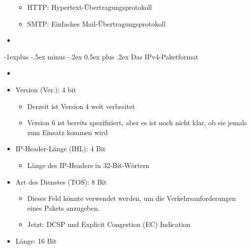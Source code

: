 \documentclass[a4paper]{article}
\makeatletter
\renewcommand{\subsection}{\@startsection{subsection}{2}{0mm}%
 {-1explus -.5ex minus -.2ex}%
 {0.5ex plus .2ex}%
 {\normalfont\normalsize\bfseries}}
\makeatother
\begin{document}
\begin{multicols}{3}
\begin{itemize}
              \begin{itemize}
                  \item
                        HTTP: Hypertext-Übertragungsprotokoll
                  \item
                        SMTP: Einfaches Mail-Übertragungsprotokoll
              \end{itemize}
        \item
    \end{itemize}


    \subsection{Das IPv4-Paketformat}

    \begin{itemize}
        \item
        \item
              Version (Ver.): 4 bit

              \begin{itemize}
                  \item
                        Derzeit ist Version 4 weit verbreitet
                  \item
                        Version 6 ist bereits spezifiziert, aber es ist noch nicht klar, ob
                        sie jemals zum Einsatz kommen wird
              \end{itemize}
        \item
              IP-Header-Länge (IHL): 4 Bit

              \begin{itemize}
                  \item
                        Länge des IP-Headers in 32-Bit-Wörtern
              \end{itemize}
        \item
              Art des Dienstes (TOS): 8 Bit

              \begin{itemize}
                  \item
                        Dieses Feld könnte verwendet werden, um die Verkehrsanforderungen
                        eines Pakets anzugeben.
                  \item
                        Jetzt: DCSP und Explicit Congestion (EC) Indication
              \end{itemize}
        \item
              Länge: 16 Bit


\end{itemize}
\end{multicols}
\end{document}
